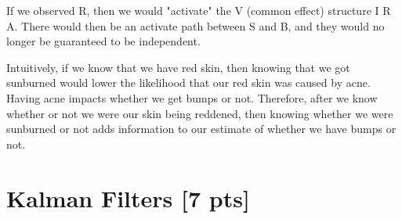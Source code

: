 \documentclass[submit]{harvardml}
\newenvironment{answer}{%
\color{answergreen}\sffamily\large}{}
\begin{document}
\begin{itemize}
            \begin{answer}
                If we observed R, then we would "activate" the V (common effect) structure I R A. There
                would then be an activate path between S and B, and they would no longer be guaranteed
                to be independent.

                Intuitively, if we know that we have red skin, then knowing that we got sunburned would
                lower the likelihood that our red skin was caused by acne. Having acne impacts whether
                we get bumps or not. Therefore, after we know whether or not we were our skin being
                reddened, then knowing whether we were sunburned or not adds information to our estimate
                of whether we have bumps or not.
            \end{answer}
    \end{itemize}
\newpage

\section*{Kalman Filters [7 pts]}
\end{document}
